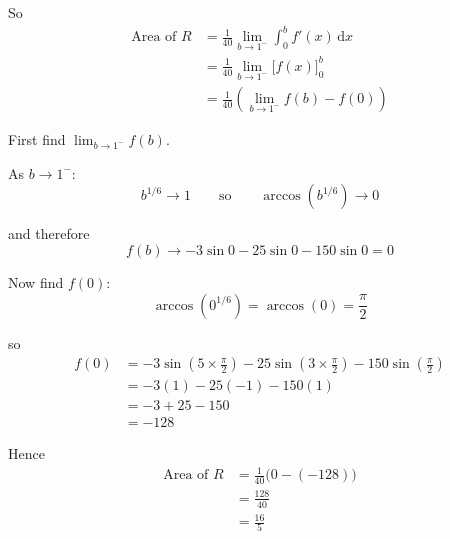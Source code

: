 \documentclass[leqno]{article}
\begin{document}
\begin{enumerate}[
  label=\textbf{\arabic*.},
  leftmargin=*,
  topsep=0pt,
  partopsep=0pt,
  parsep=0pt
]
\begin{djsSolution}
\begin{enumerate}[label=\textbf{(\alph*)}]
  So
  \begin{align*}
  \text{Area of }R
  &=\frac1{40}\lim_{b\to 1^-}\int_0^b f'(x)\,\mathrm{d}x \\
  &=\frac1{40}\lim_{b\to 1^-}\bigl[f(x)\bigr]_0^b \\
  &=\frac1{40}\left(\lim_{b\to 1^-}f(b)-f(0)\right)
  \end{align*}

  First find \(\lim_{b\to 1^-}f(b)\).

  As \(b\to 1^-\):
  \[
  b^{1/6}\to 1
  \qquad\text{so}\qquad
  \arccos(b^{1/6})\to 0
  \]

  and therefore
  \[
  f(b)\to -3\sin 0-25\sin 0-150\sin 0=0
  \]

  Now find \(f(0)\):
  \[
  \arccos(0^{1/6})=\arccos(0)=\frac{\pi}{2}
  \]

  so
  \begin{align*}
  f(0)
  &=-3\sin\left(5\times\frac{\pi}{2}\right)-25\sin\left(3\times\frac{\pi}{2}\right)-150\sin\left(\frac{\pi}{2}\right) \\
  &=-3(1)-25(-1)-150(1) \\
  &=-3+25-150 \\
  &=-128
  \end{align*}

  Hence
  \begin{align*}
  \text{Area of }R
  &=\frac1{40}\bigl(0-(-128)\bigr) \\
  &=\frac{128}{40} \\
  &=\frac{16}{5}
  \end{align*}
\end{enumerate}
\end{djsSolution}


\end{enumerate}
\end{document}
